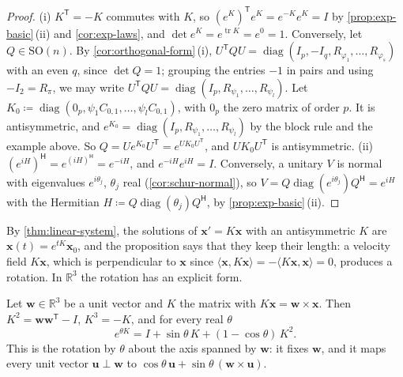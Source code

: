 \begin{proof}
(i) $K^{\mathsf T}=-K$ commutes with $K$, so $(e^K)^{\mathsf T}e^K=e^{-K}e^K=I$ by \cref{prop:exp-basic}\,(ii) and \cref{cor:exp-laws}, and $\det e^K=e^{\operatorname{tr}K}=e^0=1$. Conversely, let $Q\in\mathrm{SO}(n)$. By \cref{cor:orthogonal-form}\,(i), $U^{\mathsf T}QU=\operatorname{diag}(I_p,-I_q,R_{\varphi_1},\ldots,R_{\varphi_s})$ with an even $q$, since $\det Q=1$; grouping the entries $-1$ in pairs and using $-I_2=R_\pi$, we may write $U^{\mathsf T}QU=\operatorname{diag}(I_p,R_{\psi_1},\ldots,R_{\psi_l})$. Let $K_0\coloneqq\operatorname{diag}(0_p,\psi_1C_{0,1},\ldots,\psi_lC_{0,1})$, with $0_p$ the zero matrix of order $p$. It is antisymmetric, and $e^{K_0}=\operatorname{diag}(I_p,R_{\psi_1},\ldots,R_{\psi_l})$ by the block rule and the example above. So $Q=Ue^{K_0}U^{\mathsf T}=e^{UK_0U^{\mathsf T}}$, and $UK_0U^{\mathsf T}$ is antisymmetric. (ii) $(e^{iH})^{\mathsf H}=e^{(iH)^{\mathsf H}}=e^{-iH}$, and $e^{-iH}e^{iH}=I$. Conversely, a unitary $V$ is normal with eigenvalues $e^{i\theta_j}$, $\theta_j$ real (\cref{cor:schur-normal}), so $V=Q\operatorname{diag}(e^{i\theta_j})Q^{\mathsf H}=e^{iH}$ with the Hermitian $H\coloneqq Q\operatorname{diag}(\theta_j)Q^{\mathsf H}$, by \cref{prop:exp-basic}\,(ii).
\end{proof}

By \cref{thm:linear-system}, the solutions of $\mathbf x'=K\mathbf x$ with an antisymmetric $K$ are $\mathbf x(t)=e^{tK}\mathbf x_0$, and the proposition says that they keep their length: a velocity field $K\mathbf x$, which is perpendicular to $\mathbf x$ since $\langle\mathbf x,K\mathbf x\rangle=-\langle K\mathbf x,\mathbf x\rangle=0$, produces a rotation. In $\mathbb R^3$ the rotation has an explicit form.

\begin{proposition}
\label{prop:rodrigues}
Let $\mathbf w\in\mathbb R^3$ be a unit vector and $K$ the matrix with $K\mathbf x=\mathbf w\times\mathbf x$. Then $K^2=\mathbf w\mathbf w^{\mathsf T}-I$, $K^3=-K$, and for every real $\theta$
\[
e^{\theta K}=I+\sin\theta\,K+(1-\cos\theta)\,K^2 .
\]
This is the rotation by $\theta$ about the axis spanned by $\mathbf w$: it fixes $\mathbf w$, and it maps every unit vector $\mathbf u\perp\mathbf w$ to $\cos\theta\,\mathbf u+\sin\theta\,(\mathbf w\times\mathbf u)$.
\end{proposition}

